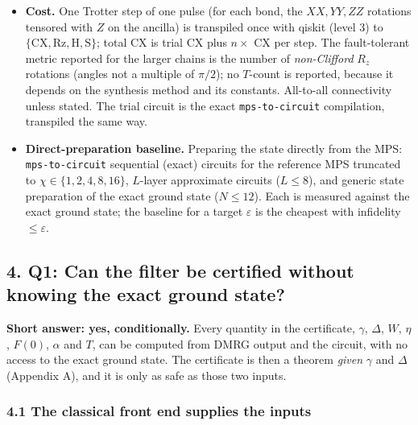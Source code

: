 \documentclass[
]{article}
\begin{document}
\begin{itemize}
  validated against a full transpile at \(n=48\)). Trotter terms are the
  individual Pauli rotations (\(\alpha\) at Pauli level), so its step
  counts are not directly comparable with the bond-gate counts of
  Sections 4--7.3.
\item
  \textbf{Cost.} One Trotter step of one pulse (for each bond, the
  \(XX,YY,ZZ\) rotations tensored with \(Z\) on the ancilla) is
  transpiled once with qiskit (level 3) to
  \(\{\mathrm{CX},\mathrm{Rz},\mathrm{H},\mathrm{S}\}\); total CX is
  trial CX plus \(n\times\) CX per step. The fault-tolerant metric
  reported for the larger chains is the number of \emph{non-Clifford}
  \(R_z\) rotations (angles not a multiple of \(\pi/2\)); no \(T\)-count
  is reported, because it depends on the synthesis method and its
  constants. All-to-all connectivity unless stated. The trial circuit is
  the exact \texttt{mps-to-circuit} compilation, transpiled the same
  way.
\item
  \textbf{Direct-preparation baseline.} Preparing the state directly
  from the MPS: \texttt{mps-to-circuit} sequential (exact) circuits for
  the reference MPS truncated to \(\chi\in\{1,2,4,8,16\}\), \(L\)-layer
  approximate circuits (\(L\le8\)), and generic state preparation of the
  exact ground state (\(N\le12\)). Each is measured against the exact
  ground state; the baseline for a target \(\varepsilon\) is the
  cheapest with infidelity \(\le\varepsilon\).
\end{itemize}

\hypertarget{q1-can-the-filter-be-certified-without-knowing-the-exact-ground-state}{%
\subsection{4. Q1: Can the filter be certified without knowing the exact
ground
state?}\label{q1-can-the-filter-be-certified-without-knowing-the-exact-ground-state}}

\textbf{Short answer: yes, conditionally.} Every quantity in the
certificate, \(\gamma\), \(\Delta\), \(W\), \(\eta\), \(F(0)\),
\(\alpha\) and \(T\), can be computed from DMRG output and the circuit,
with no access to the exact ground state. The certificate is then a
theorem \emph{given} \(\gamma\) and \(\Delta\) (Appendix A), and it is
only as safe as those two inputs.

\hypertarget{the-classical-front-end-supplies-the-inputs}{%
\subsubsection{4.1 The classical front end supplies the
inputs}\label{the-classical-front-end-supplies-the-inputs}}
\end{document}
